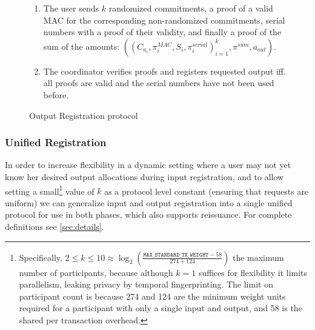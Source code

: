 \documentclass[a4paper]{article}
\begin{document}
\begin{figure}[h!]
    \begin{mdframed}
    \begin{enumerate}
        \item The user sends $k$ randomized commitments, a proof of a valid MAC for the corresponding non-randomized commitments, serial numbers with a proof of their validity, and finally a proof of the sum of the amounts: $((C_{a_i},\pi_{i}^{\textit{MAC}},S_i,\pi_i^{\textit{serial}})^{k}_{i=1}, \pi^{\textit{sum}}, a_{\textit{out}})$.
        \item The coordinator verifies proofs and registers requested output iff. all proofs are valid and the serial numbers have not been used before.
    \end{enumerate}
\end{mdframed}
    \caption{Output Registration protocol}
    \label{fig:outputreg}
\end{figure}

\subsubsection{Unified Registration}\label{sec:unified}

In order to increase flexibility in a dynamic setting where a user may not yet know her desired output allocations during input registration, and to allow setting a small\footnote{Specifically, $2 \le k \le 10 \approx \log_2\left(\frac{\mathtt{MAX\_STANDARD\_TX\_WEIGHT} - 58}{274 + 124}\right)$ the maximum number of participants, because although $k=1$ suffices for flexibility it limits parallelism, leaking privacy by temporal fingerprinting. The limit on participant count is because 274 and 124 are the minimum weight units required for a participant with only a single input and output, and 58 is the shared per transaction overhead.} value of $k$ as a protocol level constant (ensuring that requests are uniform) we can generalize input and output registration into a single unified protocol for use in both phases, which also supports reissuance. For complete definitions see \cref{sec:details}.
\end{document}
